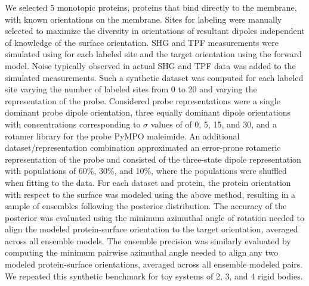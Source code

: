 \documentclass[../../main.tex]{subfiles}
\begin{document}
\begin{refsection}
	We selected 5 monotopic proteins, proteins that bind directly to the membrane, with known orientations on the membrane.
	Sites for labeling were manually selected to maximize the diversity in orientations of resultant dipoles independent of knowledge of the surface orientation.
	SHG and TPF measurements were simulated using for each labeled site and the target orientation using the forward model.
	Noise typically observed in actual SHG and TPF data was added to the simulated measurements.
	Such a synthetic dataset was computed for each labeled site varying the number of labeled sites from 0 to 20 and varying the representation of the probe.
	Considered probe representations were a single dominant probe dipole orientation, three equally dominant dipole orientations with concentrations corresponding to $\sigma$ values of of 0\textdegree, 5\textdegree, 15\textdegree, and 30\textdegree, and a rotamer library for the probe PyMPO maleimide\supercite{salafskySHGlabelsDetectionMolecules2001}.
	An additional dataset/representation combination approximated an error-prone rotameric representation of the probe and consisted of the three-state dipole representation with populations of 60\%, 30\%, and 10\%, where the populations were shuffled when fitting to the data.
	For each dataset and protein, the protein orientation with respect to the surface was modeled using the above method, resulting in a sample of ensembles following the posterior distribution.
	The accuracy of the posterior was evaluated using the minimum azimuthal angle of rotation needed to align the modeled protein-surface orientation to the target orientation, averaged across all ensemble models.
	The ensemble precision was similarly evaluated by computing the minimum pairwise azimuthal angle needed to align any two modeled protein-surface orientations, averaged across all ensemble modeled pairs.
	We repeated this synthetic benchmark for toy systems of 2, 3, and 4 rigid bodies.






	\clearpage
	\printbibliography[heading=subbibintoc]
\end{refsection}
\end{document}
